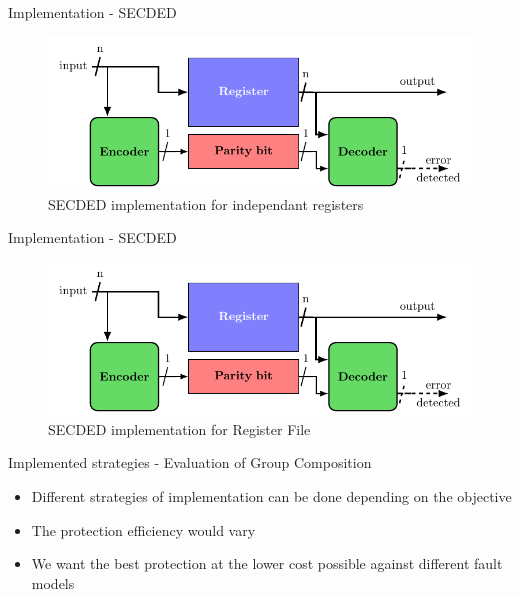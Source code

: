 \begin{frame}{Implementation - SECDED}
    \begin{figure}
        \centering
        \includegraphics[width=.8\textwidth, page=4]{src/4_strategies/img/archi_contremesures.pdf}
        \caption{SECDED implementation for independant registers}
        \label{fig:secded_implem_independant_register}
    \end{figure}
\end{frame}

\begin{frame}{Implementation - SECDED}
    \begin{figure}
        \centering
        \includegraphics[width=.9\textwidth, page=5]{src/4_strategies/img/archi_contremesures.pdf}
        \caption{SECDED implementation for Register File}
        \label{fig:secded_implem_rf}
    \end{figure}
\end{frame}
\begin{frame}{Implemented strategies - Evaluation of Group Composition}
    \begin{block}{}
        \begin{itemize}
            \justifying
            \item Different strategies of implementation can be done depending on the objective
            \item The protection efficiency would vary
            \item We want the best protection at the lower cost possible against different fault models
        \end{itemize}
    \end{block}
\end{frame}


